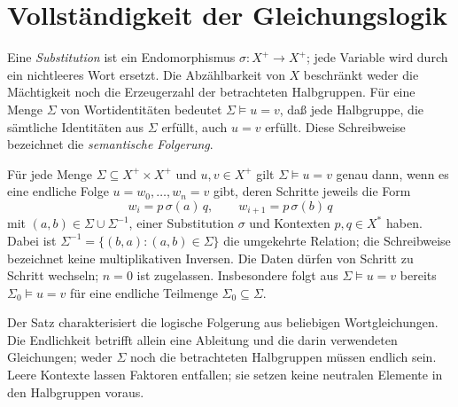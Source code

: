 \section{Vollständigkeit der Gleichungslogik}

\begin{definition}
Eine \emph{Substitution} ist ein Endomorphismus $\sigma:X^+\to X^+$;
jede Variable wird durch ein nichtleeres Wort ersetzt.
Die Abzählbarkeit von $X$ beschränkt weder die Mächtigkeit
noch die Erzeugerzahl der betrachteten Halbgruppen.
Für eine Menge $\Sigma$ von Wortidentitäten bedeutet
$\Sigma\models u=v$, daß jede Halbgruppe, die sämtliche
Identitäten aus $\Sigma$ erfüllt, auch $u=v$ erfüllt.
Diese Schreibweise bezeichnet die \emph{semantische Folgerung}.
\end{definition}

\begin{theorem}
\label{b28guide:thm:equational-completeness}
Für jede Menge $\Sigma\subseteq X^+\times X^+$ und $u,v\in X^+$
gilt $\Sigma\models u=v$ genau dann, wenn es eine endliche Folge
$u=w_0,\ldots,w_n=v$ gibt, deren Schritte jeweils die Form
\[
 w_i=p\,\sigma(a)\,q,\qquad
 w_{i+1}=p\,\sigma(b)\,q
\]
mit $(a,b)\in\Sigma\cup\Sigma^{-1}$, einer Substitution $\sigma$
und Kontexten $p,q\in X^*$ haben.
Dabei ist $\Sigma^{-1}=\{(b,a):(a,b)\in\Sigma\}$ die umgekehrte
Relation; die Schreibweise bezeichnet keine multiplikativen Inversen.
Die Daten dürfen von Schritt zu Schritt wechseln; $n=0$ ist zugelassen.
Insbesondere folgt aus $\Sigma\models u=v$ bereits
$\Sigma_0\models u=v$ für eine endliche Teilmenge
$\Sigma_0\subseteq\Sigma$.

Der Satz charakterisiert die logische Folgerung aus beliebigen
Wortgleichungen. Die Endlichkeit betrifft allein eine Ableitung
und die darin verwendeten Gleichungen; weder $\Sigma$ noch die
betrachteten Halbgruppen müssen endlich sein.
Leere Kontexte lassen Faktoren entfallen; sie setzen keine
neutralen Elemente in den Halbgruppen voraus. \cite{burris}
\end{theorem}
